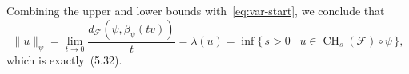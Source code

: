\documentclass[12pt]{amsart}
\numberwithin{equation}{section}
\theoremstyle{remark}
\newcommand{\cjp}[1]{{\color{orange} CJ: \footnotesize #1}}
\begin{document}
Combining the upper and lower bounds with~\eqref{eq:var-start}, we conclude that
\[
\|u\|_\psi
= \lim_{t\to 0}\frac{d_{\mathcal F}(\psi,\beta_\psi(tv))}{t}
= \lambda(u)
= \inf\{\,s>0 \mid u\in \operatorname{CH}_s(\mathcal F)\circ\psi\,\},
\]
which is exactly~(5.32).
\qedhere









\end{document}
